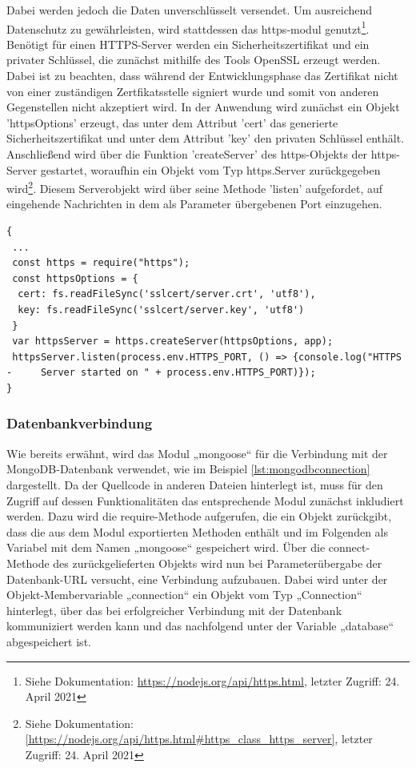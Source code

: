 \noindent
Dabei werden jedoch die Daten unverschlüsselt versendet. Um ausreichend Datenschutz zu gewährleisten, wird stattdessen das https-modul genutzt\footnote{Siehe Dokumentation: \url{https://nodejs.org/api/https.html}, letzter Zugriff: 24. April 2021}.
\newline
Benötigt für einen HTTPS-Server werden ein Sicherheitszertifikat und ein privater Schlüssel, die zunächst mithilfe des Tools OpenSSL erzeugt werden.  
Dabei ist zu beachten, dass während der Entwicklungsphase das Zertifikat nicht von einer zuständigen Zertfikatsstelle signiert wurde und somit von anderen Gegenstellen nicht akzeptiert wird.
\newline
In der Anwendung wird zunächst ein Objekt 'httpsOptions' erzeugt, das unter dem Attribut 'cert' das generierte Sicherheitszertifikat und unter dem Attribut 'key' den privaten Schlüssel enthält. Anschließend wird über die Funktion 'createServer' des https-Objekts der https-Server gestartet, woraufhin ein Objekt vom Typ https.Server zurückgegeben wird\footnote{Siehe Dokumentation:  \url{[https://nodejs.org/api/https.html\#https_class_https_server]}, letzter Zugriff: 24. April 2021}. 
Diesem Serverobjekt wird über seine Methode 'listen' aufgefordet, auf eingehende Nachrichten in dem als Parameter übergebenen Port einzugehen.\\

\begin{lstlisting}[caption=Gesicherte Verbindung, label=lst:nodejs_safeconnection]
{
 ...
 const https = require("https");
 const httpsOptions = {
  cert: fs.readFileSync('sslcert/server.crt', 'utf8'),
  key: fs.readFileSync('sslcert/server.key', 'utf8')
 }
 var httpsServer = https.createServer(httpsOptions, app);
 httpsServer.listen(process.env.HTTPS_PORT, () => {console.log("HTTPS - 	Server started on " + process.env.HTTPS_PORT)});
}
\end{lstlisting}


\subsubsection{Datenbankverbindung}
Wie bereits erwähnt, wird das Modul „mongoose“ für die Verbindung mit der MongoDB-Datenbank verwendet, wie im Beispiel \ref{lst:mongodbconnection} dargestellt.
Da der Quellcode in anderen Dateien hinterlegt ist, muss für den Zugriff auf dessen Funktionalitäten das entsprechende Modul zunächst inkludiert werden. Dazu wird die require-Methode aufgerufen, die ein Objekt zurückgibt, dass die aus dem Modul exportierten Methoden enthält und im Folgenden als Variabel mit dem Namen „mongoose“ gespeichert wird. 
\newline
Über die connect-Methode des zurückgelieferten Objekts wird nun bei Parameterübergabe der Datenbank-URL versucht, eine Verbindung aufzubauen.  
Dabei wird unter der Objekt-Membervariable  „connection“ ein Objekt vom Typ „Connection“ hinterlegt, über das bei erfolgreicher Verbindung mit der Datenbank kommuniziert werden kann und das nachfolgend unter der Variable „database“ abgespeichert ist.\\

